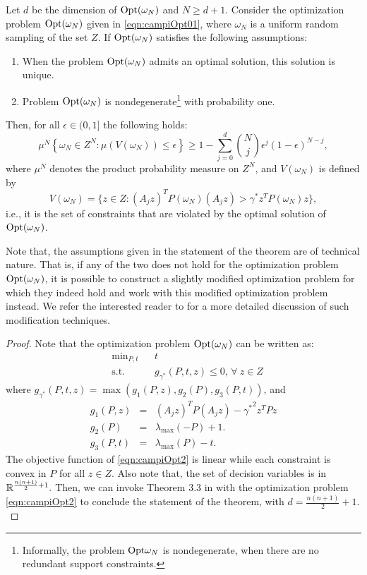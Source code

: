 \begin{theorem}\label{mainTheorem0}
Let $d$ be the dimension of $\text{Opt}(\omega_N)$ and $N \geq d+1$. Consider the optimization problem $\text{Opt}(\omega_N)$ given in \eqref{eqn:campiOpt01}, where $\omega_N$ is a uniform random sampling of the set $Z$. If $\text{Opt}(\omega_N)$ satisfies the following assumptions:
\begin{enumerate}
\item When the problem $\text{Opt}(\omega_N)$ admits an optimal solution, this solution is unique.
\item Problem $\text{Opt}(\omega_N)$ is nondegenerate\footnote{Informally, the problem $\text{Opt}{\omega_N}$ is nondegenerate, when there are no redundant support constraints.} with probability one.
\end{enumerate}
Then, for all $\epsilon \in (0,1]$ the following holds:
\begin{equation}\label{eqn:violation}\mu^N\left\{ \omega_N \in Z^N: \mu(V(\omega_N)) \leq \epsilon \right\} \geq 1- \sum_{j=0}^{d} \binom{N}{j}\epsilon^j (1-\epsilon)^{N-j},\end{equation}
where $\mu^N$ denotes the product probability measure on $Z^N$, and $V(\omega_N)$ is defined by $$V(\omega_N) = \{z \in Z: (A_j z)^TP(\omega_N)(A_j z) > \gamma^*z^TP(\omega_N)z\},$$
i.e., it is the set of constraints that are violated by the optimal solution of $\text{Opt}(\omega_N)$.
\end{theorem}

Note that, the assumptions given in the statement of the theorem are of technical nature. That is, if any of the two does not hold for the optimization problem $\text{Opt}(\omega_N)$, it is possible to construct a slightly modified optimization problem for which they indeed hold and work with this modified optimization problem instead. We refer the interested reader to \cite{campi} for a more detailed discussion of such modification techniques.

\begin{proof}Note that the optimization problem $\text{Opt}(\omega_N)$
can be written as:
\begin{equation}
\label{eqn:campiOpt2}
\begin{aligned}
& \text{min}_{P, t} & & t \\
& \text{s.t.} 
& & g_{\gamma^*}(P,t,z) \leq 0,\,\forall\ z \in Z\end{aligned}
\end{equation}
where $g_{\gamma^*}(P,t,z) = \max(g_1(P, z), g_2(P), g_3(P, t))$, and 
\begin{eqnarray*}
g_1(P, z) &=& (A_j z)^TP(A_j z) - {\gamma^*}^2 z^TPz \\
g_2(P) &=& \lambda_{\max}(-P) +1. \\
g_3(P,t) &=&  \lambda_{\max}(P) - t.
\end{eqnarray*}
The objective function of \eqref{eqn:campiOpt2} is linear while each constraint is convex in $P$ for all $z \in Z$. Also note that, the set of decision variables is in $\mathbb{R}^{\frac{n(n+1)}{2}+1}.$  Then, we can invoke Theorem 3.3 in \cite{campi} with the optimization problem \eqref{eqn:campiOpt2} to conclude the statement of the theorem, with $d=\frac{n(n+1)}{2}+1.$
\end{proof}

